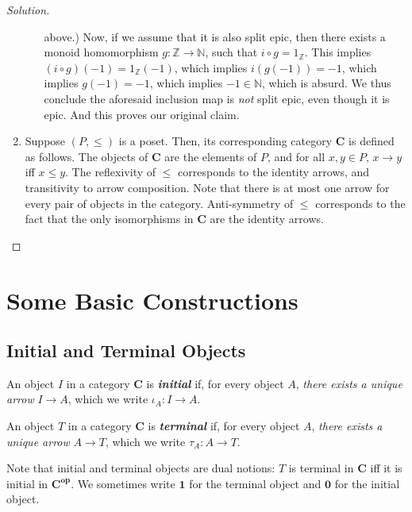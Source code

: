 \documentclass[]{amsbook}
\newcommand{\catname}[1]{\mathbf{#1}}
\newcommand{\N}{\mathbb{N}}
\newcommand{\Z}{\mathbb{Z}}
\newcommand{\0}{\mathbf{0}}
\newcommand{\1}{\mathbf{1}}
\newenvironment{solution}
    {\begin{proof}[Solution]}{\end{proof}}
\begin{document}
\begin{solution}
\begin{enumerate}
\begin{itemize}
            above.) Now, if we assume that it is also split epic, then there
            exists a monoid homomorphism $g: \Z \to \N$, such that $i \circ g =
            1_{\Z}$. This implies $(i \circ g)(-1) = 1_{\Z}(-1)$, which implies
            $i(g(-1)) = -1$, which implies $g(-1) = -1$, which implies $-1 \in
            \N$, which is absurd. We thus conclude the aforesaid inclusion map
            is \emph{not} split epic, even though it is epic. And this proves
            our original claim.
        \end{itemize}
    \item Suppose $(P, \le)$ is a poset. Then, its corresponding category
    $\catname{C}$ is defined as follows. The objects of $\catname{C}$ are the
    elements of $P$, and for all $x, y \in P$, $x \to y$ iff $x \le y$. The
    reflexivity of $\le$ corresponds to the identity arrows, and transitivity
    to arrow composition. Note that there is at most one arrow for every pair
    of objects in the category. Anti-symmetry of $\le$ corresponds to the fact
    that the only isomorphisms in $\catname{C}$ are the identity arrows.
    \end{enumerate}
\end{solution}

\section{Some Basic Constructions}
\subsection*{Initial and Terminal Objects}
An object $I$ in a category $\catname{C}$ is \emph{\textbf{initial}} if, for
every object $A$, \emph{there exists a unique arrow} $I \to A$, which we write
$\iota_{A}: I \to A$.

An object $T$ in a category $\catname{C}$ is \emph{\textbf{terminal}} if, for
every object $A$, \emph{there exists a unique arrow} $A \to T$, which we write
$\tau_{A}: A \to T$.

Note that initial and terminal objects are dual notions: $T$ is terminal in
$\catname{C}$ iff it is initial in $\catname{C}^{\mathbf{op}}$. We sometimes
write $\1$ for the terminal object and $\0$ for the initial object.
\end{document}
